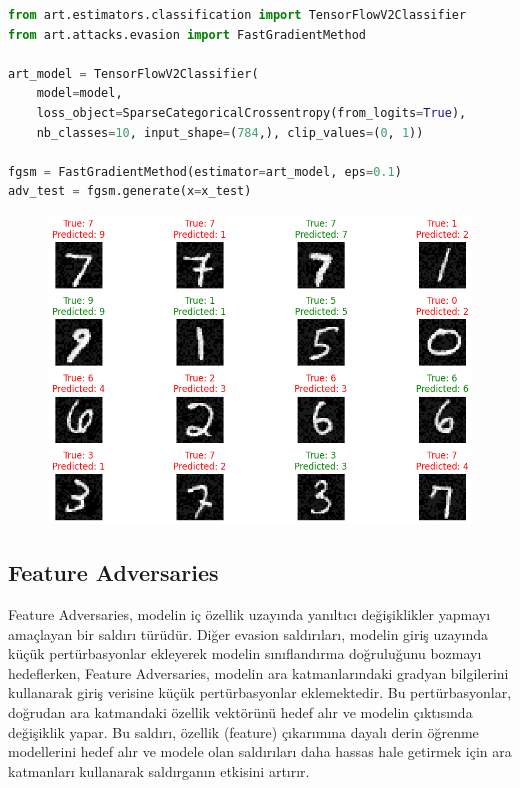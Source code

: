 \begin{lstlisting}[language=Python]
from art.estimators.classification import TensorFlowV2Classifier
from art.attacks.evasion import FastGradientMethod

art_model = TensorFlowV2Classifier(
    model=model, 
    loss_object=SparseCategoricalCrossentropy(from_logits=True), 
    nb_classes=10, input_shape=(784,), clip_values=(0, 1))

fgsm = FastGradientMethod(estimator=art_model, eps=0.1)
adv_test = fgsm.generate(x=x_test)
\end{lstlisting}

\newpage

\begin{figure}[h]
    \centering
    \includegraphics[width=1\textwidth]{images/fgm_attack_results.png}
    \caption{}
\end{figure}

\newpage

\subsection{Feature Adversaries}

Feature Adversaries, modelin iç özellik uzayında yanıltıcı değişiklikler yapmayı amaçlayan bir saldırı türüdür. Diğer evasion saldırıları, modelin giriş uzayında küçük pertürbasyonlar ekleyerek modelin sınıflandırma doğruluğunu bozmayı hedeflerken, Feature Adversaries, modelin ara katmanlarındaki gradyan bilgilerini kullanarak giriş verisine küçük pertürbasyonlar eklemektedir. Bu pertürbasyonlar, doğrudan ara katmandaki özellik vektörünü hedef alır ve modelin çıktısında değişiklik yapar. Bu saldırı, özellik (feature) çıkarımına dayalı derin öğrenme modellerini hedef alır ve modele olan saldırıları daha hassas hale getirmek için ara katmanları kullanarak saldırganın etkisini artırır.

